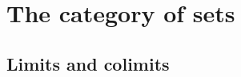 \documentclass[hott-all.tex]{subfiles}
\begin{document}
% 
% 
% 
\section{The category of sets}
% 
% 
\subsection{Limits and colimits}
% 
% 
% 
% 
\end{document}
